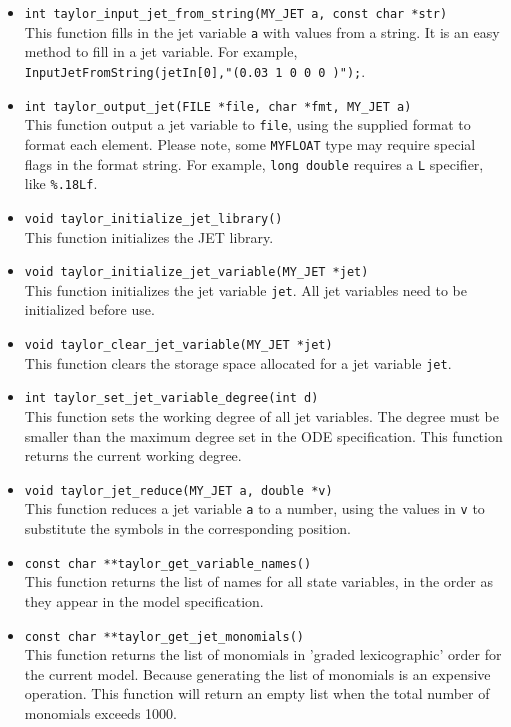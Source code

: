 \documentclass[10pt]{article}
\theoremstyle{remark}
\newcommand{\myfloat}{{\tt MY\symbol{95}FLOAT}}
\begin{document}
\begin{itemize}
\item{\verb+int taylor_input_jet_from_string(MY_JET a, const char *str)+\\
    This function fills in the jet variable \verb+a+ with values from
    a string. It is an easy method to fill in a jet variable. For
    example, \verb+InputJetFromString(jetIn[0],"(0.03 1 0 0 0 )");+.}
    
\item \verb+int taylor_output_jet(FILE *file, char *fmt, MY_JET a)+\\
    This function output a jet variable to \verb+file+, using the
    supplied format to format each element. Please note, some
    \myfloat{} type may require special flags in the format
    string. For example, \verb+long double+ requires a \verb+L+
    specifier, like \verb+%.18Lf+.

\item{\verb+void taylor_initialize_jet_library()+\\    
    This function initializes the JET library. }
    
\item{\verb+void taylor_initialize_jet_variable(MY_JET *jet)+\\
    This function initializes the jet variable \verb+jet+. All jet
    variables need to be initialized before use.}
    
\item{\verb+void taylor_clear_jet_variable(MY_JET *jet)+\\
  This function clears the storage space allocated for a jet variable
  \verb+jet+.}
  
\item{\verb+int taylor_set_jet_variable_degree(int d)+\\
    This function sets the working degree of all jet variables.  The
    degree must be smaller than the maximum degree set in the ODE
    specification.  This function returns the current working degree.}
    
\item{\verb+void taylor_jet_reduce(MY_JET a, double *v)+\\
    This function reduces a jet variable \verb+a+ to a number, using
    the values in \verb+v+ to substitute the symbols in the
    corresponding position.}
    
\item{\verb+const char **taylor_get_variable_names()+\\
    This function returns the list of names for all state variables,
    in the order as they appear in the model specification.}
    
\item{\verb+const char **taylor_get_jet_monomials()+\\
    This function returns the list of monomials in 'graded
    lexicographic' order for the current model. Because generating the
    list of monomials is an expensive operation. This function will
    return an empty list when the total number of monomials exceeds
    1000.}
\end{itemize}
\end{document}
